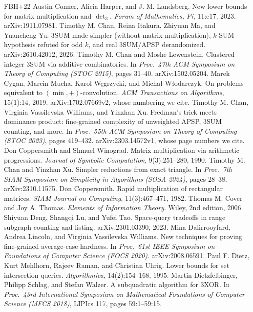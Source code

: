 \documentclass[11pt]{article}
\theoremstyle{definition}
\theoremstyle{remark}
\begin{document}
{\begin{thebibliography}{FBH{+}22}
 Austin Conner, Alicia Harper, and J. M. Landsberg. New lower bounds for matrix multiplication and $\det_3$. \emph{Forum of Mathematics, Pi}, 11:e17, 2023. arXiv:1911.07981.
 Timothy M. Chan, Reina Itakura, Zhiyuan Ma, and Yuancheng Yu. 3SUM made simpler (without matrix multiplication), $k$-SUM hypothesis refuted for odd $k$, and real 3SUM/APSP derandomized. arXiv:2610.42012, 2026.
 Timothy M. Chan and Moshe Lewenstein. Clustered integer 3SUM via additive combinatorics. In \emph{Proc.\ 47th ACM Symposium on Theory of Computing (STOC 2015)}, pages 31--40. arXiv:1502.05204.
 Marek Cygan, Marcin Mucha, Karol W\k{e}grzycki, and Micha\l{} W\l{}odarczyk. On problems equivalent to $(\min,+)$-convolution. \emph{ACM Transactions on Algorithms}, 15(1):14, 2019. arXiv:1702.07669v2, whose numbering we cite.
 Timothy M. Chan, Virginia Vassilevska Williams, and Yinzhan Xu. Fredman's trick meets dominance product: fine-grained complexity of unweighted APSP, 3SUM counting, and more. In \emph{Proc.\ 55th ACM Symposium on Theory of Computing (STOC 2023)}, pages 419--432. arXiv:2303.14572v1, whose page numbers we cite.
 Don Coppersmith and Shmuel Winograd. Matrix multiplication via arithmetic progressions. \emph{Journal of Symbolic Computation}, 9(3):251--280, 1990.
 Timothy M. Chan and Yinzhan Xu. Simpler reductions from exact triangle. In \emph{Proc.\ 7th SIAM Symposium on Simplicity in Algorithms (SOSA 2024)}, pages 28--38. arXiv:2310.11575.
 Don Coppersmith. Rapid multiplication of rectangular matrices. \emph{SIAM Journal on Computing}, 11(3):467--471, 1982.
 Thomas M. Cover and Joy A. Thomas. \emph{Elements of Information Theory}. Wiley, 2nd edition, 2006.
 Shiyuan Deng, Shangqi Lu, and Yufei Tao. Space-query tradeoffs in range subgraph counting and listing. arXiv:2301.03390, 2023.
 Mina Dalirrooyfard, Andrea Lincoln, and Virginia Vassilevska Williams. New techniques for proving fine-grained average-case hardness. In \emph{Proc.\ 61st IEEE Symposium on Foundations of Computer Science (FOCS 2020)}. arXiv:2008.06591.
 Paul F. Dietz, Kurt Mehlhorn, Rajeev Raman, and Christian Uhrig. Lower bounds for set intersection queries. \emph{Algorithmica}, 14(2):154--168, 1995.
 Martin Dietzfelbinger, Philipp Schlag, and Stefan Walzer. A subquadratic algorithm for 3XOR. In \emph{Proc.\ 43rd International Symposium on Mathematical Foundations of Computer Science (MFCS 2018)}, LIPIcs 117, pages 59:1--59:15.

\end{thebibliography}}
\end{document}

